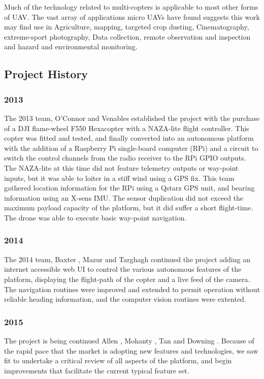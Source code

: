 \documentclass[a4paper, 11pt, titlepage]{article}
\begin{document}
    Much of the technology related to multi-copters is applicable to most other forms of UAV.  The vast array of applications micro UAVs have found suggests this work may find use in Agriculture, mapping, targeted crop dusting, Cinematography, extreme-sport photography, Data collection, remote observation and inspection and hazard and environmental monitoring.


  \subsection{Project History}
    \subsubsection{2013}
    The 2013 team, O'Connor \cite{OConnor} and Venables \cite{Venables} established the project with the purchase of a DJI flame-wheel F550 Hexacopter with a NAZA-lite flight controller.  This copter was fitted and tested, and finally converted into an autonomous platform with the addition of a Raspberry Pi single-board computer (RPi) and a circuit to switch the control channels from the radio receiver to the RPi GPIO outputs.
    The NAZA-lite at this time did not feature telemetry outputs or way-point inputs, but it was able to loiter in a stiff wind using a GPS fix.
    This team gathered location information for the RPi using a Qstarz GPS unit, and bearing information using an X-sens IMU.  The sensor duplication did not exceed the maximum payload capacity of the platform, but it did suffer a short flight-time.
    The drone was able to execute basic way-point navigation.
    \subsubsection{2014}

    The 2014 team, Baxter \cite{Baxter}, Mazur \cite{Mazur} and Targhagh \cite{Targhagh} continued the project adding an internet accessible web UI to control the various autonomous features of the platform, displaying the flight-path of the copter and a live feed of the camera.
    The navigation routines were improved and extended to permit operation without reliable heading information, and the computer vision routines were extented.

    \subsubsection{2015}
    The project is being continued Allen \cite{Allen}, Mohanty \cite{Mohanty}, Tan \cite{Tan} and Downing \cite{Downing}.
    Because of the rapid pace that the market is adopting new features and technologies, we saw fit to undertake a critical review of all aspects of the platform, and begin improvements that facilitate the current typical feature set.
\end{document}
